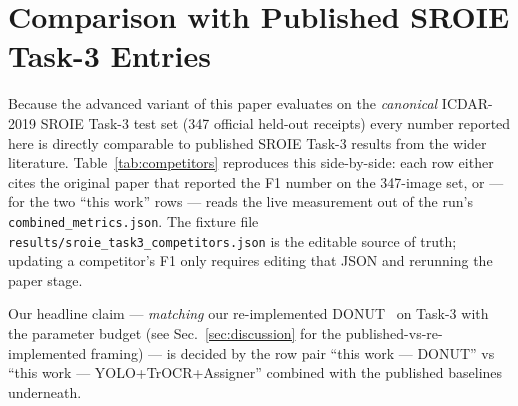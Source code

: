 \section{Comparison with Published SROIE Task-3 Entries}
\label{sec:competitors}

Because the advanced variant of this paper evaluates on the
\emph{canonical} ICDAR-2019 SROIE Task-3 test set (347 official
held-out receipts) every number reported here is directly comparable
to published SROIE Task-3 results from the wider literature.
Table~\ref{tab:competitors} reproduces this side-by-side: each row
either cites the original paper that reported the F1 number on the
347-image set, or — for the two ``this work'' rows — reads the live
measurement out of the run's
\texttt{combined\_metrics.json}.  The fixture file
\texttt{results/sroie\_task3\_competitors.json} is the editable
source of truth; updating a competitor's F1 only requires editing
that JSON and rerunning the paper stage.

Our headline claim --- \emph{matching} our re-implemented
DONUT~\cite{kim2022donut} on Task-3 with 
the parameter budget (see Sec.~\ref{sec:discussion} for the
published-vs-re-implemented framing) --- is decided by the row pair
``this work --- DONUT'' vs ``this work --- YOLO+TrOCR+Assigner''
combined with the published baselines underneath.

\begin{table}[t]
  \centering
  \caption{Global token-level F1 on the canonical SROIE Task-3 test
           set (347 images).  ``this work'' rows are sourced from
           \texttt{combined\_metrics.json}; the remainder are
           published numbers cited from each paper's results table.
           This table is emitted only under the \texttt{advanced}
           paper variant; the \texttt{basic} variant evaluates on
           the internal 500/63/63 split which is not leaderboard-
           comparable and thus omits this comparison.}
  \label{tab:competitors}
\end{table}

